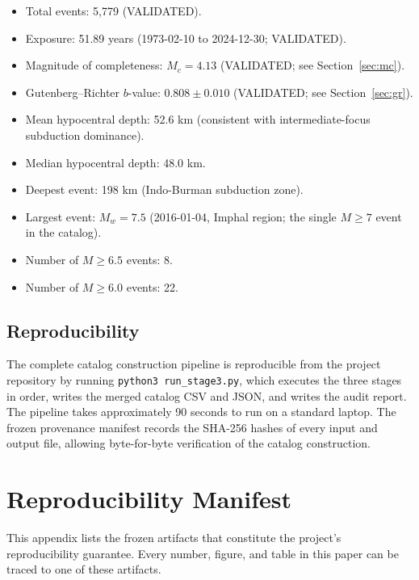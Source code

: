 \documentclass[10pt,a4paper,twocolumn]{article}
\begin{document}
\begin{itemize}[leftmargin=1.2em,itemsep=2pt,topsep=2pt]
\item Total events: 5{,}779 (VALIDATED).
\item Exposure: 51.89 years (1973-02-10 to 2024-12-30; VALIDATED).
\item Magnitude of completeness: $M_c = 4.13$ (VALIDATED; see Section~\ref{sec:mc}).
\item Gutenberg--Richter $b$-value: $0.808 \pm 0.010$ (VALIDATED; see Section~\ref{sec:gr}).
\item Mean hypocentral depth: 52.6 km (consistent with intermediate-focus subduction dominance).
\item Median hypocentral depth: 48.0 km.
\item Deepest event: 198 km (Indo-Burman subduction zone).
\item Largest event: $M_w = 7.5$ (2016-01-04, Imphal region; the single $M\geq7$ event in the catalog).
\item Number of $M\geq6.5$ events: 8.
\item Number of $M\geq6.0$ events: 22.
\end{itemize}

\subsection{Reproducibility}

The complete catalog construction pipeline is reproducible from the project repository by running \texttt{python3 run\_stage3.py}, which executes the three stages in order, writes the merged catalog CSV and JSON, and writes the audit report. The pipeline takes approximately 90 seconds to run on a standard laptop. The frozen provenance manifest records the SHA-256 hashes of every input and output file, allowing byte-for-byte verification of the catalog construction.

\section{Reproducibility Manifest}\label{app:reproducibility}

This appendix lists the frozen artifacts that constitute the project's reproducibility guarantee. Every number, figure, and table in this paper can be traced to one of these artifacts.
\end{document}

